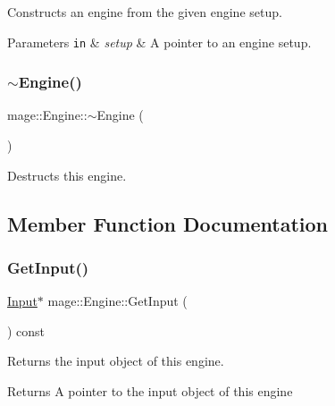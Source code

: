 Constructs an engine from the given engine setup.


\begin{DoxyParams}[1]{Parameters}
\mbox{\tt in}  & {\em setup} & A pointer to an engine setup. \\
\hline
\end{DoxyParams}
\hypertarget{classmage_1_1_engine_a34628556f8397d70ed018d71e343c2f5}{}\label{classmage_1_1_engine_a34628556f8397d70ed018d71e343c2f5} 
\subsubsection{\texorpdfstring{$\sim$\+Engine()}{~Engine()}}
{\footnotesize\ttfamily mage\+::\+Engine\+::$\sim$\+Engine (\begin{DoxyParamCaption}{ }\end{DoxyParamCaption})\hspace{0.3cm}{\ttfamily [virtual]}}

Destructs this engine. 

\subsection{Member Function Documentation}
\hypertarget{classmage_1_1_engine_a55d099d040e8895803f15e214f3b6d9e}{}\label{classmage_1_1_engine_a55d099d040e8895803f15e214f3b6d9e} 
\subsubsection{\texorpdfstring{Get\+Input()}{GetInput()}}
{\footnotesize\ttfamily \hyperlink{classmage_1_1_input}{Input}$\ast$ mage\+::\+Engine\+::\+Get\+Input (\begin{DoxyParamCaption}{ }\end{DoxyParamCaption}) const}

Returns the input object of this engine.

\begin{DoxyReturn}{Returns}
A pointer to the input object of this engine 
\end{DoxyReturn}
\hypertarget{classmage_1_1_engine_a22e0e2bf1a42a3d4e79d7b768d9bbe15}{}\label{classmage_1_1_engine_a22e0e2bf1a42a3d4e79d7b768d9bbe15} 
